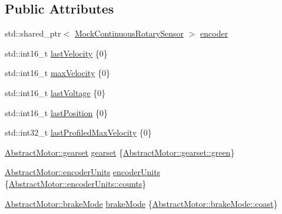 \subsection*{Public Attributes}
\begin{DoxyCompactItemize}
\item 
std\+::shared\+\_\+ptr$<$ \mbox{\hyperlink{classokapi_1_1MockContinuousRotarySensor}{Mock\+Continuous\+Rotary\+Sensor}} $>$ \mbox{\hyperlink{classokapi_1_1MockMotor_ac23216fd541e5ea5b59f096ba8c8f6c4}{encoder}}
\item 
std\+::int16\+\_\+t \mbox{\hyperlink{classokapi_1_1MockMotor_a9d36a5a5c27a44ee933665124340b9d5}{last\+Velocity}} \{0\}
\item 
std\+::int16\+\_\+t \mbox{\hyperlink{classokapi_1_1MockMotor_abe59f07dccf41f7d31958e4987310601}{max\+Velocity}} \{0\}
\item 
std\+::int16\+\_\+t \mbox{\hyperlink{classokapi_1_1MockMotor_a9aa3ed225ab0c3daca85e4428ae94067}{last\+Voltage}} \{0\}
\item 
std\+::int16\+\_\+t \mbox{\hyperlink{classokapi_1_1MockMotor_a13fbd1a947731e558126b3d7bda7e299}{last\+Position}} \{0\}
\item 
std\+::int32\+\_\+t \mbox{\hyperlink{classokapi_1_1MockMotor_a6eafd5c0423b3e6db96385819204f6af}{last\+Profiled\+Max\+Velocity}} \{0\}
\item 
\mbox{\hyperlink{classokapi_1_1AbstractMotor_a88aaa6ea2fa10f5520a537bbf26774d5}{Abstract\+Motor\+::gearset}} \mbox{\hyperlink{classokapi_1_1MockMotor_ace0f87238f30c86dbac3454b3034a968}{gearset}} \{\mbox{\hyperlink{classokapi_1_1AbstractMotor_a88aaa6ea2fa10f5520a537bbf26774d5a9f27410725ab8cc8854a2769c7a516b8}{Abstract\+Motor\+::gearset\+::green}}\}
\item 
\mbox{\hyperlink{classokapi_1_1AbstractMotor_ae811cd825099f2defadeb1b7f7e7764c}{Abstract\+Motor\+::encoder\+Units}} \mbox{\hyperlink{classokapi_1_1MockMotor_a5f14fb5824d9cf3bbdb198ee5dda039d}{encoder\+Units}} \{\mbox{\hyperlink{classokapi_1_1AbstractMotor_ae811cd825099f2defadeb1b7f7e7764ca0700cd3e2cd8b37ef510dd5aa2c81fc6}{Abstract\+Motor\+::encoder\+Units\+::counts}}\}
\item 
\mbox{\hyperlink{classokapi_1_1AbstractMotor_a132e0485dbb59a60c3f934338d8fa601}{Abstract\+Motor\+::brake\+Mode}} \mbox{\hyperlink{classokapi_1_1MockMotor_a2dde4bb999510d533d243cd4d2d8126e}{brake\+Mode}} \{\mbox{\hyperlink{classokapi_1_1AbstractMotor_a132e0485dbb59a60c3f934338d8fa601a756d153ba898e1be8218d4651009e981}{Abstract\+Motor\+::brake\+Mode\+::coast}}\}
\end{DoxyCompactItemize}
